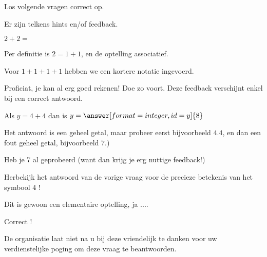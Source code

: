 \documentclass{ximera}
\begin{document}
\begin{exercise}
    Los volgende vragen correct op. 
    
    Er zijn telkens hints en/of feedback.
    
        \begin{question} %
          $2+2 = $
          \begin{hint}
              Per definitie is $2 = 1+1$, en de optelling associatief.
           \end{hint}  
           \begin{hint}
              Voor $1+1+1+1$ hebben we een kortere notatie ingevoerd.
           \end{hint}
           \begin{feedback}[correct] 
              Proficiat, je kan al erg goed rekenen! Doe zo voort. 
              Deze feedback verschijnt enkel bij een correct antwoord.
           \end{feedback}          
        \end{question}
   
        \begin{question}
          Als $y=4+4$ dan is $y = \answer[format=integer,id=y]{8}$ 
          
          Het antwoord is een geheel getal, maar probeer eerst bijvoorbeeld $4.4$, en dan een fout geheel getal, bijvoorbeeld $7$.)
          \begin{hint}[0]
              Heb je 7 al geprobeerd (want dan krijg je erg nuttige feedback!)
          \end{hint}
          \begin{hint}
            Herbekijk het antwoord van de vorige vraag voor de precieze betekenis van het symbool $4$ !
          \end{hint}
          \begin{hint}[3]
            Dit is gewoon een elementaire optelling, ja ....
          \end{hint}
      
          \begin{feedback}[correct]
              Correct !
          \end{feedback}
          \begin{feedback}[attempt]
            De organisatie laat niet na u bij deze vriendelijk te danken voor uw verdienstelijke poging om deze vraag te beantwoorden.
            

\end{feedback}
\end{question}
\end{exercise}
\end{document}

